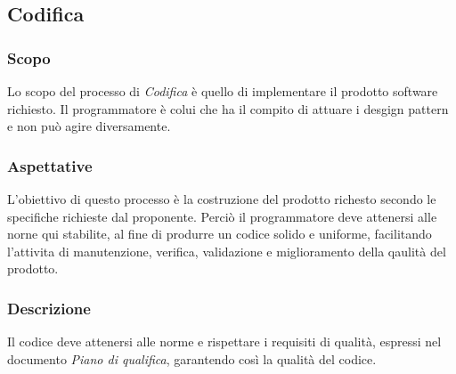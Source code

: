 	\subsection{Codifica}
		\subsubsection{Scopo}
		Lo scopo del processo di \textit{Codifica} è quello di implementare il prodotto software richiesto. Il programmatore è colui che ha il compito di attuare i desgign pattern e non può agire diversamente.
		\subsubsection{Aspettative}
		L'obiettivo di questo processo è la costruzione del prodotto richesto secondo le specifiche richieste dal proponente. Perciò il programmatore deve attenersi alle norne qui stabilite, al fine di produrre un codice solido e uniforme, facilitando l'attivita di manutenzione, verifica, validazione e miglioramento della qaulità del prodotto.
		\subsubsection{Descrizione}
		Il codice deve attenersi alle norme e rispettare i requisiti di qualità, espressi nel documento \textit{Piano di qualifica}, garantendo così la qualità del codice.
